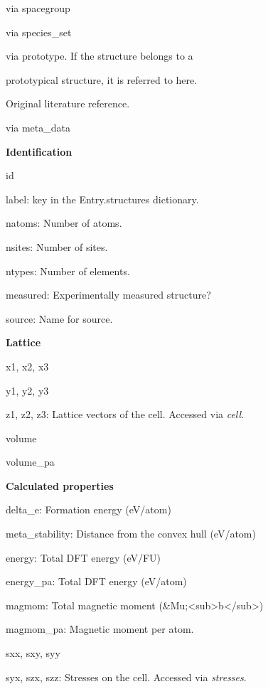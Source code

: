 \documentclass[letterpaper,10pt,english]{sphinxmanual}
\begin{document}
\begin{fulllineitems}
\begin{description}
\begin{DUlineblock}{0em}
\item[] {\hyperref[models:qmpy.Spacegroup]{}} via spacegroup
\item[] {\hyperref[models:qmpy.Species]{}} via species\_set
\item[] {\hyperref[models:qmpy.Prototype]{}} via prototype. If the structure belongs to a
\item[]
\begin{DUlineblock}{\DUlineblockindent}
\item[] prototypical structure, it is referred to here.
\end{DUlineblock}
\item[] {\hyperref[models:qmpy.Reference]{}} Original literature reference.
\item[] {\hyperref[models:qmpy.MetaData]{}} via meta\_data
\end{DUlineblock}

\item[{Attributes:}] \leavevmode
\begin{DUlineblock}{0em}
\item[] \textbf{Identification}
\item[] id
\item[] label: key in the Entry.structures dictionary.
\item[] natoms: Number of atoms.
\item[] nsites: Number of sites.
\item[] ntypes: Number of elements.
\item[] measured: Experimentally measured structure?
\item[] source: Name for source.
\item[] 
\item[] \textbf{Lattice}
\item[] x1, x2, x3
\item[] y1, y2, y3
\item[] z1, z2, z3: Lattice vectors of the cell. Accessed via \emph{cell}.
\item[] volume
\item[] volume\_pa
\item[] 
\item[] \textbf{Calculated properties}
\item[] delta\_e: Formation energy (eV/atom)
\item[] meta\_stability: Distance from the convex hull (eV/atom)
\item[] energy: Total DFT energy (eV/FU)
\item[] energy\_pa: Total DFT energy (eV/atom)
\item[] magmom: Total magnetic moment (\&Mu;\textless{}sub\textgreater{}b\textless{}/sub\textgreater{})
\item[] magmom\_pa: Magnetic moment per atom.
\item[] sxx, sxy, syy
\item[] syx, szx, szz: Stresses on the cell. Accessed via \emph{stresses}.
\end{DUlineblock}


\end{description}
\end{fulllineitems}
\end{document}
